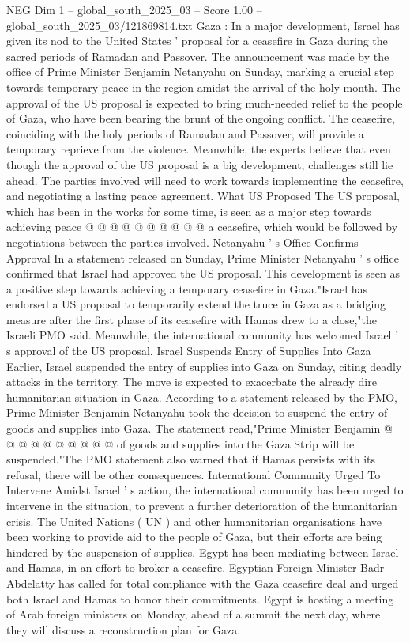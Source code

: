 \begin{textsample}{NEG Dim 1 – global\_south\_2025\_03 – Score 1.00 – global\_south\_2025\_03/121869814.txt}  \label{ex:f1_neg_164}
Gaza : In a major development, Israel has given its nod to the United States ' proposal for a ceasefire in Gaza during the sacred periods of Ramadan and Passover.
The announcement was made by the office of Prime Minister Benjamin Netanyahu on Sunday, marking a crucial step towards temporary peace in the region amidst the arrival of the holy month.
The approval of the US proposal is expected to bring much-needed relief to the people of Gaza, who have been bearing the brunt of the ongoing conflict.
The ceasefire, coinciding with the holy periods of Ramadan and Passover, will provide a temporary reprieve from the violence.
Meanwhile, the experts believe that even though the approval of the US proposal is a big development, challenges still lie ahead.
The parties involved will need to work towards implementing the ceasefire, and negotiating a lasting peace agreement.
What US Proposed The US proposal, which has been in the works for some time, is seen as a major step towards achieving peace @ @ @ @ @ @ @ @ @ @ a ceasefire, which would be followed by negotiations between the parties involved.
Netanyahu ' s Office Confirms Approval In a statement released on Sunday, Prime Minister Netanyahu ' s office confirmed that Israel had approved the US proposal.
This development is seen as a positive step towards achieving a temporary ceasefire in Gaza."Israel has endorsed a US proposal to temporarily extend the truce in Gaza as a bridging measure after the first phase of its ceasefire with Hamas drew to a close,"the Israeli PMO said.
Meanwhile, the international community has welcomed Israel ' s approval of the US proposal.
Israel Suspends Entry of Supplies Into Gaza Earlier, Israel suspended the entry of supplies into Gaza on Sunday, citing deadly attacks in the territory.
The move is expected to exacerbate the already dire humanitarian situation in Gaza.
According to a statement released by the PMO, Prime Minister Benjamin Netanyahu took the decision to suspend the entry of goods and supplies into Gaza.
The statement read,"Prime Minister Benjamin @ @ @ @ @ @ @ @ @ @ of goods and supplies into the Gaza Strip will be suspended."The PMO statement also warned that if Hamas persists with its refusal, there will be other consequences.
International Community Urged To Intervene Amidst Israel ' s action, the international community has been urged to intervene in the situation, to prevent a further deterioration of the humanitarian crisis.
The United Nations ( UN ) and other humanitarian organisations have been working to provide aid to the people of Gaza, but their efforts are being hindered by the suspension of supplies.
Egypt has been mediating between Israel and Hamas, in an effort to broker a ceasefire.
Egyptian Foreign Minister Badr Abdelatty has called for total compliance with the Gaza ceasefire deal and urged both Israel and Hamas to honor their commitments.
Egypt is hosting a meeting of Arab foreign ministers on Monday, ahead of a summit the next day, where they will discuss a reconstruction plan for Gaza.

\end{textsample}
